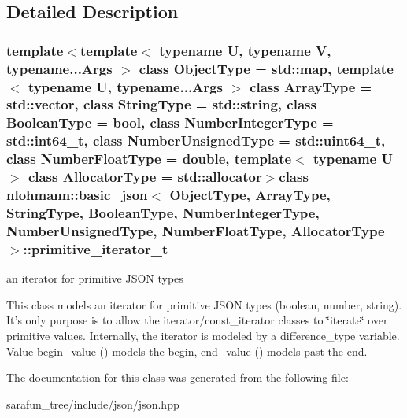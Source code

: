 \subsection{Detailed Description}
\subsubsection*{template$<$template$<$ typename U, typename V, typename...\-Args $>$ class Object\-Type = std\-::map, template$<$ typename U, typename...\-Args $>$ class Array\-Type = std\-::vector, class String\-Type = std\-::string, class Boolean\-Type = bool, class Number\-Integer\-Type = std\-::int64\-\_\-t, class Number\-Unsigned\-Type = std\-::uint64\-\_\-t, class Number\-Float\-Type = double, template$<$ typename U $>$ class Allocator\-Type = std\-::allocator$>$class nlohmann\-::basic\-\_\-json$<$ Object\-Type, Array\-Type, String\-Type, Boolean\-Type, Number\-Integer\-Type, Number\-Unsigned\-Type, Number\-Float\-Type, Allocator\-Type $>$\-::primitive\-\_\-iterator\-\_\-t}

an iterator for primitive J\-S\-O\-N types 

This class models an iterator for primitive J\-S\-O\-N types (boolean, number, string). It's only purpose is to allow the iterator/const\-\_\-iterator classes to \char`\"{}iterate\char`\"{} over primitive values. Internally, the iterator is modeled by a {\ttfamily difference\-\_\-type} variable. Value begin\-\_\-value ({}) models the begin, end\-\_\-value ({}) models past the end. 

The documentation for this class was generated from the following file\-:\begin{DoxyCompactItemize}
\item 
sarafun\-\_\-tree/include/json/json.\-hpp\end{DoxyCompactItemize}
